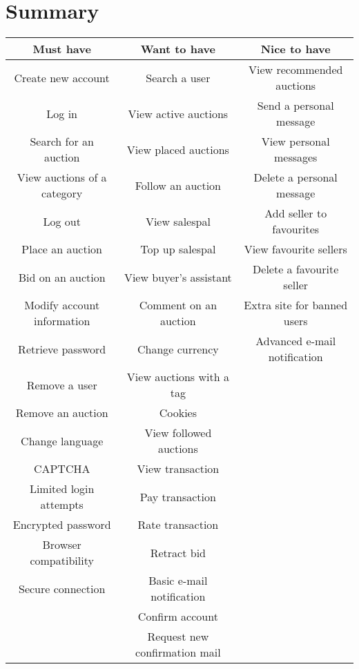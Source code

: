 \section{Summary}
	\begin{tabular}{|c|c|c|}	
		\hline \textbf{Must have} & \textbf{Want to have} & \textbf{Nice to have} \\ 
		\hline  Create new account & Search a user & View recommended auctions \\ 
		\hline  Log in & View active auctions & Send a personal message \\ 
		\hline  Search for an auction & View placed auctions & View personal messages \\
		\hline  View auctions of a category & Follow an auction & Delete a personal message \\ 
		\hline  Log out & View salespal & Add seller to favourites \\ 
		\hline  Place an auction & Top up salespal & View favourite sellers \\ 
		\hline  Bid on an auction & View buyer's assistant &  Delete a favourite seller\\ 
		\hline  Modify account information & Comment on an auction & Extra site for banned users \\ 
		\hline  Retrieve password & Change currency & Advanced e-mail notification \\ 
		\hline  Remove a user & View auctions with a tag &  \\ 
		\hline  Remove an auction & Cookies &  \\ 
		\hline  Change language & View followed auctions &  \\ 
		\hline  CAPTCHA & View transaction &  \\ 
		\hline  Limited login attempts & Pay transaction  &  \\ 
		\hline  Encrypted password & Rate transaction  &  \\
		\hline  Browser compatibility & Retract bid  &  \\
		\hline  Secure connection & Basic e-mail notification &  \\
		\hline  & Confirm account &  \\
		\hline  & Request new confirmation mail &  \\
		\hline
	\end{tabular} 